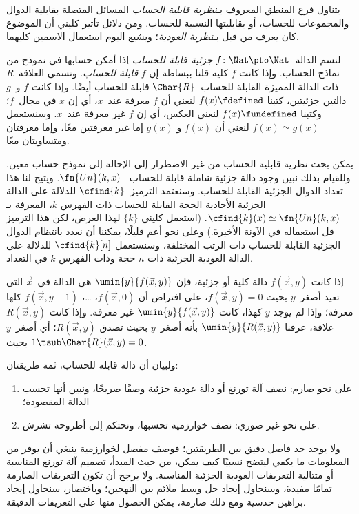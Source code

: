 \documentclass[../../../include/open-logic-section]{subfiles}
\begin{document}

يتناول فرع المنطق المعروف بـ\emph{نظرية قابلية الحساب} المسائل المتصلة
بقابلية الدوال والمجموعات للحساب، أو بقابليتها النسبية للحساب. ومن دلائل
تأثير كليني أن الموضوع كان يعرف من قبل بـ\emph{نظرية العودية}؛ ويشيع
اليوم استعمال الاسمين كليهما.

لنسم الدالة~$f\colon\Nat\pto\Nat$ \emph{جزئية قابلة للحساب} إذا أمكن
حسابها في نموذج من نماذج الحساب. وإذا كانت $f$ كلية قلنا ببساطة إن
$f$ \emph{قابلة للحساب}. وتسمى العلاقة~$R$ ذات الدالة المميزة القابلة
للحساب~$\Char{R}$ قابلة للحساب أيضًا. وإذا كانت $f$ و~$g$ دالتين
جزئيتين، كتبنا $f(x)\fdefined$ لنعني أن $f$ معرفة عند~$x$، أي إن
$x$ في مجال~$f$؛ وكتبنا $f(x)\fundefined$ لنعني العكس، أي إن $f$
غير معرفة عند~$x$. وسنستعمل $f(x)\simeq g(x)$ لنعني أن $f(x)$ و
$g(x)$ إما غير معرفتين معًا، وإما معرفتان ومتساويتان معًا.

يمكن بحث نظرية قابلية الحساب من غير الاضطرار إلى الإحالة إلى نموذج
حساب معين. وللقيام بذلك نبين وجود دالة جزئية شاملة قابلة للحساب
~$\fn{Un}(k,x)$. ويتيح لنا هذا تعداد الدوال الجزئية القابلة للحساب.
وسنعتمد الترميز~$\cfind{k}$ للدلالة على الدالة الجزئية الأحادية الحجة
القابلة للحساب ذات الفهرس $k$، المعرفة بـ
$\cfind{k}(x)\simeq\fn{Un}(k,x)$. (استعمل كليني $\{k\}$ لهذا الغرض،
لكن هذا الترميز قل استعماله في الآونة الأخيرة.) وعلى نحو أعم قليلًا،
يمكننا أن نعدد بانتظام الدوال الجزئية القابلة للحساب ذات الرتب
المختلفة، وسنستعمل $\cfind{k}[n]$ للدلالة على الدالة العودية الجزئية
ذات $n$ حجة وذات الفهرس $k$ في التعداد.

إذا كانت $f(\vec x,y)$ دالة كلية أو جزئية، فإن
$\umin{y}{f(\vec x,y)}$ هي الدالة في~$\vec x$ التي تعيد أصغر~$y$
بحيث $f(\vec x,y)=0$، على افتراض أن $f(\vec x,0)$، …،
$f(\vec x,y-1)$ كلها معرفة؛ وإذا لم يوجد $y$ كهذا، كانت
$\umin{y}{f(\vec x,y)}$ غير معرفة. وإذا كانت $R(\vec x,y)$ علاقة،
عرفنا $\umin{y}{R(\vec x,y)}$ بأنه أصغر~$y$ بحيث تصدق
$R(\vec x,y)$؛ أي أصغر~$y$ بحيث $1\tsub\Char{R}(\vec x,y)=0$.

ولبيان أن دالة قابلة للحساب، ثمة طريقتان:
\begin{enumerate}
\item على نحو صارم: نصف آلة تورنغ أو دالة عودية جزئية وصفًا صريحًا،
  ونبين أنها تحسب الدالة المقصودة؛
\item على نحو غير صوري: نصف خوارزمية تحسبها، ونحتكم إلى أطروحة تشرش.
\end{enumerate}
ولا يوجد حد فاصل دقيق بين الطريقتين؛ فوصف مفصل لخوارزمية ينبغي أن يوفر
من المعلومات ما يكفي ليتضح نسبيًا كيف يمكن، من حيث المبدأ، تصميم آلة
تورنغ المناسبة أو متتالية التعريفات العودية الجزئية المناسبة. ولا يرجح
أن تكون التعريفات الصارمة تمامًا مفيدة، وسنحاول إيجاد حل وسط ملائم بين
النهجين؛ وباختصار، سنحاول إيجاد براهين حدسية ومع ذلك صارمة، يمكن الحصول
منها على التعريفات الدقيقة.
\end{document}
